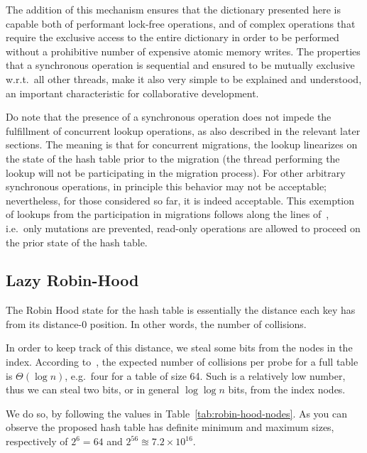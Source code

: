 The addition of this mechanism ensures that the dictionary presented here is capable both of performant lock-free operations, and of complex operations that require the exclusive access to the entire dictionary in order to be performed without a prohibitive number of expensive atomic memory writes.
The properties that a synchronous operation is sequential and ensured to be mutually exclusive w.r.t.\ all other threads, make it also very simple to be explained and understood, an important characteristic for collaborative development.

Do note that the presence of a synchronous operation does not impede the fulfillment of concurrent lookup operations, as also described in the relevant later sections.
The meaning is that for concurrent migrations, the lookup linearizes on the state of the hash table prior to the migration (the thread performing the lookup will not be participating in the migration process).
For other arbitrary synchronous operations, in principle this behavior may not be acceptable; nevertheless, for those considered so far, it is indeed acceptable.
This exemption of lookups from the participation in migrations follows along the lines of~\cite[\S5.3.2, Preventing Concurrent Updates to Ensure Consistency]{maier}, i.e.\ only mutations are prevented, read-only operations are allowed to proceed on the prior state of the hash table.


\subsection{Lazy Robin-Hood}\label{subsec:lazy-robin-hood}

The Robin Hood state for the hash table is essentially the distance each key has from its distance-0 position.
In other words, the number of collisions.

In order to keep track of this distance, we steal some bits from the nodes in the index.
According to~\cite[Corollary to Theorem~3]{robin-hood}, the expected number of collisions per probe for a full table is $\Theta(\log n)$, e.g.\ four for a table of size 64.
Such is a relatively low number, thus we can steal two bits, or in general $\log \log n$ bits, from the index nodes.

We do so, by following the values in Table~\ref{tab:robin-hood-nodes}.
As you can observe the proposed hash table has definite minimum and maximum sizes, respectively of $2^{6} = 64$ and $2^{56} \approxeq 7.2 \times 10^{16}$.

